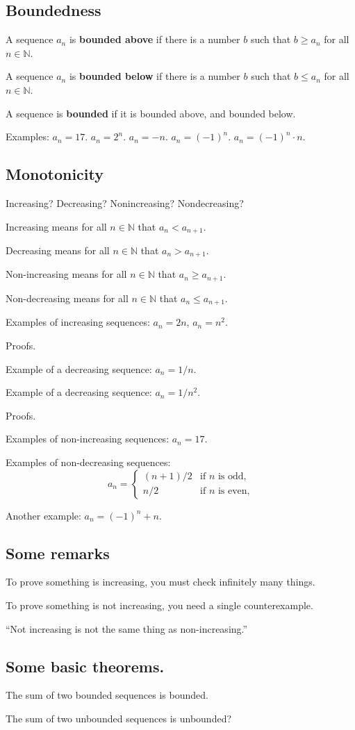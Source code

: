 \documentclass[12pt]{article}
\newcommand{\N}{\mathbb{N}}
\begin{document}
\subsection{Boundedness}

A sequence $a_n$ is \textbf{bounded above} if there is a number $b$
such that $b \geq a_n$ for all $n \in \N$.

A sequence $a_n$ is \textbf{bounded below} if there is a number $b$
such that $b \leq a_n$ for all $n \in \N$.

A sequence is \textbf{bounded} if it is bounded above, and bounded
below.

Examples: $a_n = 17$.  $a_n = 2^n$.  $a_n = -n$.  $a_n = (-1)^n$.
$a_n = (-1)^n \cdot n$.

\subsection{Monotonicity}

Increasing?  Decreasing?  Nonincreasing?  Nondecreasing?

Increasing means for all $n \in \N$ that $a_n < a_{n+1}$.

Decreasing means for all $n \in \N$ that $a_n > a_{n+1}$.

Non-increasing means for all $n \in \N$ that $a_n \geq a_{n+1}$.

Non-decreasing means for all $n \in \N$ that $a_n \leq a_{n+1}$.

Examples of increasing sequences: $a_n = 2n$, $a_n = n^2$.

Proofs.

Example of a decreasing sequence: $a_n = 1/n$.

Example of a decreasing sequence: $a_n = 1/n^2$.

Proofs.

Examples of non-increasing sequences: $a_n = 17$.

Examples of non-decreasing sequences:
$$
a_n = \begin{cases}
(n+1)/2 & \mbox{if $n$ is odd,} \\
n/2 & \mbox{if $n$ is even,}
\end{cases}
$$

Another example: $a_n = (-1)^n + n$.

\subsection{Some remarks}

To prove something is increasing, you must check infinitely many things.

To prove something is not increasing, you need a single counterexample.

``Not increasing is not the same thing as non-increasing.''

\subsection{Some basic theorems.}

The sum of two bounded sequences is bounded.

The sum of two unbounded sequences is unbounded?
\end{document}
